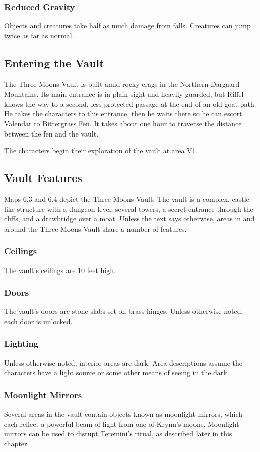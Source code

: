 \documentclass[10pt,a4paper,twoside,bg=print,twocolumn,openany,nodeprecatedcode]{dndbook}
\begin{document}
\subsubsection{Reduced Gravity}
Objects and creatures take half as much damage from falls. Creatures can jump twice as far as normal.

\subsection{Entering the Vault}
The Three Moons Vault is built amid rocky crags in the Northern Dargaard Mountains. Its main entrance is in plain sight and heavily guarded, but Riffel knows the way to a second, less-protected passage at the end of an old goat path. He takes the characters to this entrance, then he waits there so he can escort Valendar to Bittergrass Fen. It takes about one hour to traverse the distance between the fen and the vault.

The characters begin their exploration of the vault at area V1.

\subsection{Vault Features}
Maps 6.3 and 6.4 depict the Three Moons Vault. The vault is a complex, castle-like structure with a dungeon level, several towers, a secret entrance through the cliffs, and a drawbridge over a moat. Unless the text says otherwise, areas in and around the Three Moons Vault share a number of features.

\subsubsection{Ceilings}
The vault's ceilings are 10 feet high.

\subsubsection{Doors}
The vault's doors are stone slabs set on brass hinges. Unless otherwise noted, each door is unlocked.

\subsubsection{Lighting}
Unless otherwise noted, interior areas are dark. Area descriptions assume the characters have a light source or some other means of seeing in the dark.

\subsubsection{Moonlight Mirrors}
Several areas in the vault contain objects known as moonlight mirrors, which each reflect a powerful beam of light from one of Krynn's moons. Moonlight mirrors can be used to disrupt Teremini's ritual, as described later in this chapter.
\end{document}
